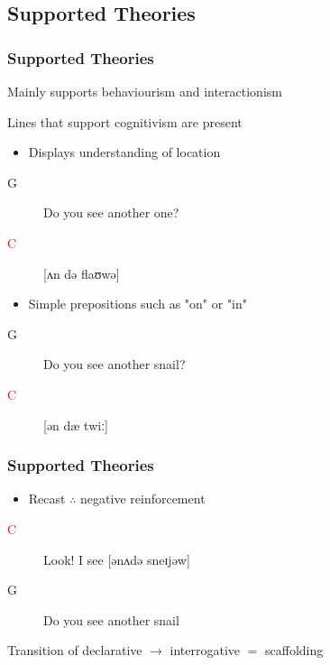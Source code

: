 \documentclass[compress]{beamer}
\begin{document}
\subsection{Supported Theories}
\begin{frame}
	\frametitle{Supported Theories}
	
	Mainly supports behaviourism and interactionism
	
	Lines that support cognitivism are present
	
	\begin{itemize}
		\item Displays understanding of location
	\end{itemize}
	\begin{description}
		\item[G] Do you see another one?
		\item[\textcolor{red}{C}] [ʌn də flaʊwə]
	\end{description}
	
	\begin{itemize}
		\item Simple prepositions such as "on" or "in"
	\end{itemize}
	\begin{description}
		\item[G] Do you see another snail?
		\item[\textcolor{red}{C}] [ən dæ twiː]
	\end{description}
\end{frame}

\begin{frame}
	\frametitle{Supported Theories}
	
	\begin{itemize}
		\item Recast $\therefore$ negative reinforcement
	\end{itemize}
	\begin{description}
		\item[\textcolor{red}{C}] Look! I see [ənʌdə sneɪjəw]
		\item[G] Do you see another snail
	\end{description}
	
	\begin{block}{}
		Transition of declarative $\rightarrow$ interrogative $=$ scaffolding
	\end{block}
\end{frame}

\end{document}

